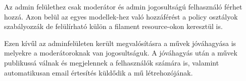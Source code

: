 Az admin felülethez csak moderátor és admin jogosultságú felhasználó férhet hozzá. Azon belül az egyes modellek-hez való hozzáférést a policy osztályok szabályozzák de felülírható külön a filament resource-okon keresztül is.

Ezen kívűl az adminfelületen került megvalósításra a művek jóváhagyása is melyekre a moderátoroknak van jogosultságuk. A jóváhagyás után a művek publikussá válnak és megjelennek a felhasználók számára is, valamint automatikusan email értesítés küldődik a mű létrehozójának.